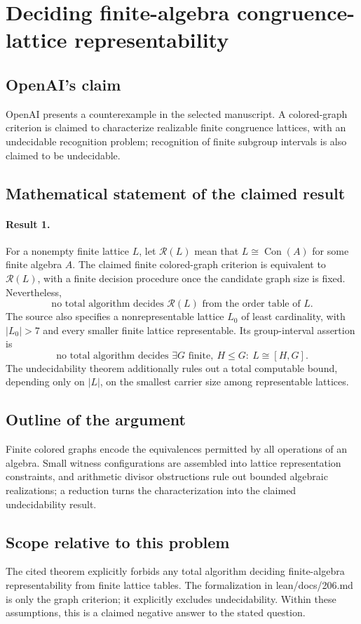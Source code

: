 \documentclass[11pt]{article}
\begin{document}
\section*{Deciding finite-algebra congruence-lattice representability}

\subsection{OpenAI's claim}
OpenAI presents a counterexample in the selected manuscript. A colored-graph criterion is claimed to characterize realizable finite congruence lattices, with an undecidable recognition problem; recognition of finite subgroup intervals is also claimed to be undecidable.

\subsection{Mathematical statement of the claimed result}
\paragraph{Result 1.} For a nonempty finite lattice \(L\), let \(\mathcal R(L)\) mean that \(L\cong\operatorname{Con}(A)\) for some finite algebra \(A\). The claimed finite colored-graph criterion is equivalent to \(\mathcal R(L)\), with a finite decision procedure once the candidate graph size is fixed. Nevertheless,
\[
 \text{no total algorithm decides }\mathcal R(L)\text{ from the order table of }L.
\]
The source also specifies a nonrepresentable lattice \(L_0\) of least cardinality, with \(|L_0|>7\) and every smaller finite lattice representable. Its group-interval assertion is
\[
 \text{no total algorithm decides }\exists G\text{ finite},\ H\le G:\ L\cong[H,G].
\]
The undecidability theorem additionally rules out a total computable bound, depending only on \(|L|\), on the smallest carrier size among representable lattices.

\subsection{Outline of the argument}
Finite colored graphs encode the equivalences permitted by all operations of an algebra. Small witness configurations are assembled into lattice representation constraints, and arithmetic divisor obstructions rule out bounded algebraic realizations; a reduction turns the characterization into the claimed undecidability result.

\subsection{Scope relative to this problem}
The cited theorem explicitly forbids any total algorithm deciding finite-algebra representability from finite lattice tables. The formalization in lean/docs/206.md is only the graph criterion; it explicitly excludes undecidability. Within these assumptions, this is a claimed negative answer to the stated question.
\end{document}
